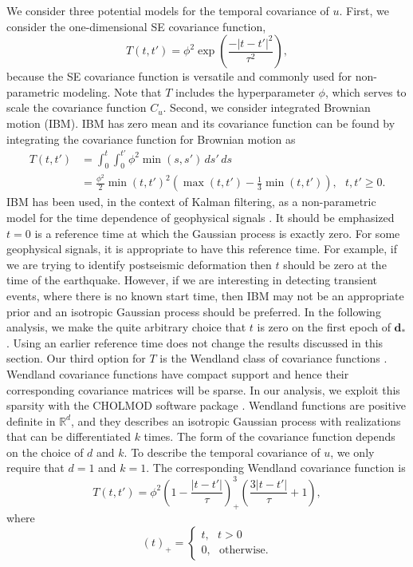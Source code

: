 \documentclass[10pt,letter]{article}
\begin{document}
We consider three potential models for the temporal covariance of $u$. First, we consider the one-dimensional SE covariance function, 
\begin{equation}\label{eq:TimeSE}
T(t,t') = \phi^2\exp\left(\frac{-|t - t'|^2}{\tau^2}\right),
\end{equation}
because the SE covariance function is versatile and commonly used for non-parametric modeling. Note that $T$ includes the hyperparameter $\phi$, which serves to scale the covariance function $C_u$. Second, we consider integrated Brownian motion (IBM). IBM has zero mean and its covariance function can be found by integrating the covariance function for Brownian motion as
\begin{align}\label{eq:IBM}
T(t,t') &= \int_0^t \int_0^{t'} \phi^2 \min(s,s') \,ds'\,ds \\
        &= \frac{\phi^2}{2}\min(t,t')^2 \left(\max(t,t') - \frac{1}{3}\min(t,t')\right), \ \ \ t,t' \geq 0.
\end{align}
IBM has been used, in the context of Kalman filtering, as a non-parametric model for the time dependence of geophysical signals \citep[e.g.,][]{Segall1997,McGuire2003,Ohtani2010,Hines2016}. It should be emphasized $t=0$ is a reference time at which the Gaussian process is exactly zero.  For some geophysical signals, it is appropriate to have this reference time. For example, if we are trying to identify postseismic deformation then $t$ should be zero at the time of the earthquake.  However, if we are interesting in detecting transient events, where there is no known start time, then IBM may not be an appropriate prior and an isotropic Gaussian process should be preferred. In the following analysis, we make the quite arbitrary choice that $t$ is zero on the first epoch of $\bm{d}_*$. Using an earlier reference time does not change the results discussed in this section. Our third option for $T$ is the Wendland class of covariance functions \citep{Wendland2005}. Wendland covariance functions have compact support and hence their corresponding covariance matrices will be sparse. In our analysis, we exploit this sparsity with the CHOLMOD software package \citep{Chen2008}.  Wendland functions are positive definite in $\mathbb{R}^d$, and they describes an isotropic Gaussian process with realizations that can be differentiated $k$ times. The form of the covariance function depends on the choice of $d$ and $k$. To describe the temporal covariance of $u$, we only require that $d=1$ and $k=1$. The corresponding Wendland covariance function is 
\begin{equation}\label{eq:Wendland}
T(t,t') = \phi^2\left(1 - \frac{|t - t'|}{\tau}\right)^3_+ \left(\frac{3|t - t'|}{\tau} + 1\right), 
\end{equation}
where
\begin{equation}
(t)_+ = 
\begin{cases}
t, \ \ \ t > 0 \\
0, \ \ \ \mathrm{otherwise}.
\end{cases}
\end{equation}
\end{document}
